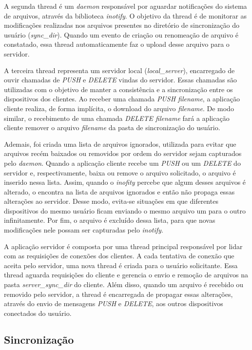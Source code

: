\documentclass[a4paper]{article}
\begin{document}
A segunda thread é um \textit{daemon} responsável por aguardar notificações do sistema de arquivos, através da biblioteca \textit{inotify}. O objetivo da thread é de monitorar as modificações realizadas nos arquivos presentes no diretório de sincronização do usuário (\textit{sync\_dir}). Quando um evento de criação ou renomeação de arquivo é constatado, essa thread automaticamente faz o upload desse arquivo para o servidor.

A terceira thread representa um servidor local (\textit{local\_server}), encarregado de ouvir chamadas de \textit{PUSH} e \textit{DELETE} vindas do servidor. Essas chamadas são utilizadas com o objetivo de manter a consistência e a sincronização entre os dispositivos dos clientes. Ao receber uma chamada \textit{PUSH filename}, a aplicação cliente realiza, de forma implícita, o download do arquivo \textit{filename}. De modo similar, o recebimento de uma chamada \textit{DELETE filename} fará a aplicação cliente remover o arquivo \textit{filename} da pasta de sincronização do usuário.

Ademais, foi criada uma lista de arquivos ignorados, utilizada para evitar que arquivos recém baixados ou removidos por ordem do servidor sejam capturados pelo \textit{daemon}. Quando a aplicação cliente recebe um \textit{PUSH} ou um \textit{DELETE} do servidor e, respectivamente, baixa ou remove o arquivo solicitado, o arquivo é inserido nessa lista. Assim, quando o \textit{inofity} percebe que algum desses arquivos é alterado, o encontra na lista de arquivos ignorados e então não propaga essas alterações ao servidor. Desse modo, evita-se situações em que diferentes dispositivos do mesmo usuário ficam enviando o mesmo arquivo um para o outro infinitamente. Por fim, o arquivo é excluído dessa lista, para que novas modificações nele possam ser capturadas pelo \textit{inotify}.

A aplicação servidor é composta por uma thread principal responsável por lidar com as requisições de conexões dos clientes. A cada tentativa de conexão que aceita pelo servidor, uma nova thread é criada para o usuário solicitante. Essa thread aguarda requisições do cliente e gerencia o envio e remoção de arquivos na pasta \textit{server\_sync\_dir} do cliente. Além disso, quando um arquivo é recebido ou removido pelo servidor, a thread é encarregada de propagar essas alterações, através do envio de mensagens \textit{PUSH} e \textit{DELETE}, aos outros dispositivos conectados do usuário.

\subsection{Sincronização}
\end{document}
